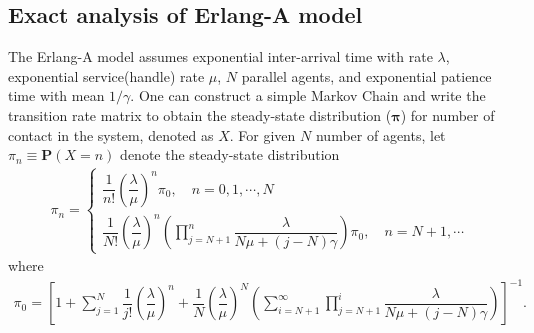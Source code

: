 \documentclass{article}
\begin{document}
\subsection{Exact analysis of Erlang-A model}\label{sec:appendix-erlanga}
The Erlang-A model assumes exponential inter-arrival time with rate $\lambda$, exponential service(handle) rate $\mu$, $N$ parallel agents, and exponential patience time with mean $1/\gamma$. One can construct a simple Markov Chain and write the transition rate matrix to obtain the steady-state distribution ($\mathbf{\pi}$) for number of contact in the system, denoted as $X$. For given $N$ number of agents, let $\pi_n\equiv\mathbf{P}(X=n)$ denote the steady-state distribution
\begin{align}
	\pi_n=\begin{cases}
		 \dfrac{1}{n!}\left({\dfrac{\lambda}{\mu}}\right)^n\pi_0,\quad n=0,1,\cdots,N\\
		 \dfrac{1}{N!}
		 {\left(\dfrac{\lambda}{\mu}\right)}^n
		 \left(
		 \prod_{j=N+1}^n\dfrac{\lambda}{N\mu+(j-N)\gamma}
		 \right)\pi_0, \quad n=N+1, \cdots
	\end{cases}
\end{align}where 
\begin{align}
	\pi_0=\left[1+\sum_{j=1}^{N}\dfrac{1}{j!}\left({\dfrac{\lambda}{\mu}}\right)^n
	+\dfrac{1}{N}\left({\dfrac{\lambda}{\mu}}\right)^N
	\left(\sum_{i=N+1}^{\infty}\prod_{j=N+1}^i\dfrac{\lambda}{N\mu+(j-N)\gamma}\right)
	\right]^{-1}.
\end{align}
\end{document}

